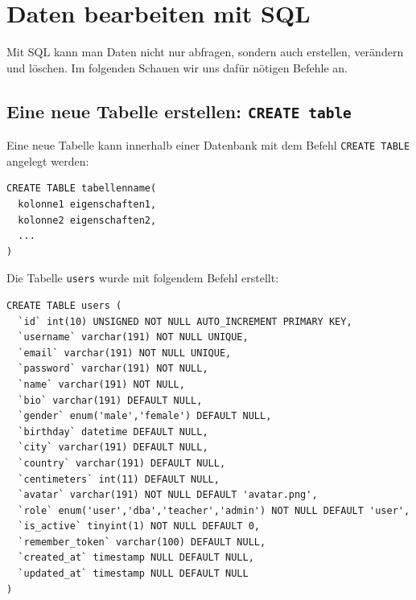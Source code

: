 \pagebreak

\section{Daten bearbeiten mit \gls{SQL}}
Mit SQL kann man Daten nicht nur abfragen, sondern auch erstellen, verändern und löschen. Im folgenden Schauen wir uns dafür nötigen Befehle an.

\subsection{Eine neue Tabelle erstellen: \lstinline[style=sql]|CREATE table|}
\label{subsec:create-table}
Eine neue Tabelle kann innerhalb einer Datenbank mit dem Befehl \lstinline[style=sql]|CREATE TABLE| angelegt werden:

\begin{lstlisting}[style=sql]
CREATE TABLE tabellenname(
  kolonne1 eigenschaften1,
  kolonne2 eigenschaften2,
  ...
)
\end{lstlisting}

\begin{myexample}
\label{ex:sql-create}
Die Tabelle \texttt{users} wurde mit folgendem Befehl erstellt:

\begin{lstlisting}[style=sql]
CREATE TABLE users (
  `id` int(10) UNSIGNED NOT NULL AUTO_INCREMENT PRIMARY KEY,
  `username` varchar(191) NOT NULL UNIQUE,
  `email` varchar(191) NOT NULL UNIQUE,
  `password` varchar(191) NOT NULL,
  `name` varchar(191) NOT NULL,
  `bio` varchar(191) DEFAULT NULL,
  `gender` enum('male','female') DEFAULT NULL,
  `birthday` datetime DEFAULT NULL,
  `city` varchar(191) DEFAULT NULL,
  `country` varchar(191) DEFAULT NULL,
  `centimeters` int(11) DEFAULT NULL,
  `avatar` varchar(191) NOT NULL DEFAULT 'avatar.png',
  `role` enum('user','dba','teacher','admin') NOT NULL DEFAULT 'user',
  `is_active` tinyint(1) NOT NULL DEFAULT 0,
  `remember_token` varchar(100) DEFAULT NULL,
  `created_at` timestamp NULL DEFAULT NULL,
  `updated_at` timestamp NULL DEFAULT NULL
)
\end{lstlisting}
\end{myexample}

